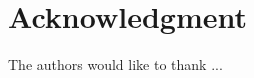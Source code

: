 \documentclass[journal]{IEEEtran}
\begin{document}
\section*{Acknowledgment}


The authors would like to thank ...


\ifCLASSOPTIONcaptionsoff
  \newpage
\fi







%



%
\end{document}
